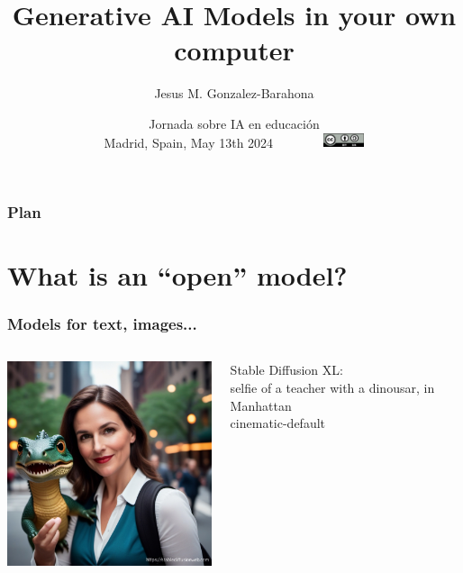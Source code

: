 \documentclass[17pt,aspectratio=169,hyperref={pdfusetitle,colorlinks,allcolors=olive}]{beamer}
\title[Generative AI]{Generative AI Models in your own computer}
\author[Jesus M. Gonzalez-Barahona]{Jesus M. Gonzalez-Barahona}
\institute[URJC]{Universidad Rey Juan Carlos \\
  \url{https://floss.social/@jgbarah} ~~~~~ \url{https://jgbarah.github.io/presentations}}
\date[May 2024]{\small Jornada sobre IA en educación \\
  Madrid, Spain, May 13th 2024~~~~~~~~\includegraphics[width=1.2cm]{figs/by-sa}}
\begin{document}
\begin{frame}
  \maketitle
\end{frame}



\begin{frame}
  \frametitle{Plan}
\tableofcontents
\end{frame}


\section{What is an ``open'' model?}


\begin{frame}[fragile]
  \frametitle{Models for text, images...}

    \begin{columns}[T]
    \begin{column}{.58\textwidth}
        \includegraphics[width=7cm]{figs/selfie}
    \end{column}%
    \hfill%
    \begin{column}{.38\textwidth}
      {\small Stable Diffusion XL:} \\
      selfie of a teacher with a dinousar, in Manhattan \\
      cinematic-default \\
    \end{column}%
  \end{columns}

\end{frame}
\end{document}
